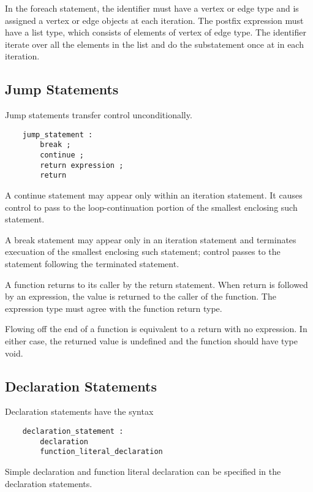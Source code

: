 \documentclass[letterpaper,12pt]{article}
\begin{document}
In the foreach statement, the identifier must have a vertex or edge type and is assigned a vertex or edge objects at each iteration. The postfix expression must have a list type, which consists of elements of vertex of edge type. The identifier iterate over all the elements in the list and do the substatement once at in each iteration.

\subsection{Jump Statements}
Jump statements transfer control unconditionally.
\begin{lstlisting}
	jump_statement :
		break ;
		continue ;
		return expression ;
		return
\end{lstlisting}
 A continue statement may appear only within an iteration statement. It causes control to pass to the loop-continuation portion of the smallest enclosing such statement.\newline

A break statement may appear only in an iteration statement and terminates execuation of the smallest enclosing such statement; control passes to the statement following the terminated statement. \newline

A function returns to its caller by the return statement. When return is followed by an expression, the value is returned to the caller of the function. The expression type must agree with the function return type. \newline

 Flowing off the end of a function is equivalent to a return with no expression. In either case, the returned value is undefined and the function should have type void. \newline

\subsection{Declaration Statements}
Declaration statements have the syntax
\begin{lstlisting}
	declaration_statement :
		declaration
		function_literal_declaration
\end{lstlisting}
Simple declaration and function literal declaration can be specified in the declaration statements.  
\end{document}
